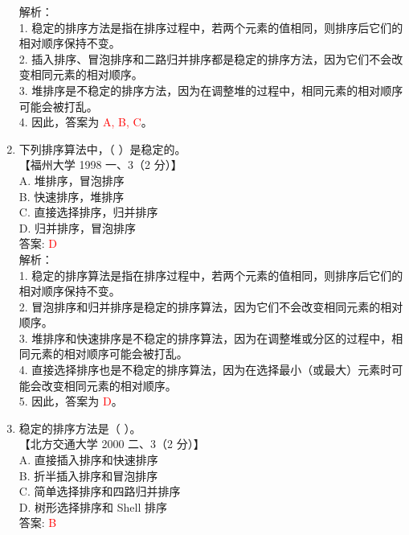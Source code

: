 \documentclass[lang=cn,newtx,10pt,scheme=chinese]{../../../elegantbook}
\begin{document}
\begin{enumerate}
    解析：\\
    1. 稳定的排序方法是指在排序过程中，若两个元素的值相同，则排序后它们的相对顺序保持不变。\\
    2. 插入排序、冒泡排序和二路归并排序都是稳定的排序方法，因为它们不会改变相同元素的相对顺序。\\
    3. 堆排序是不稳定的排序方法，因为在调整堆的过程中，相同元素的相对顺序可能会被打乱。\\
    4. 因此，答案为 \textcolor{red}{A, B, C}。\\

    \item 下列排序算法中，（ ）是稳定的。\\
    【福州大学 1998 一、3（2 分）】\\

    A. 堆排序，冒泡排序 \\  
    B. 快速排序，堆排序 \\  
    C. 直接选择排序，归并排序 \\  
    D. 归并排序，冒泡排序 \\

    答案: \textcolor{red}{D} \\

    解析：\\
    1. 稳定的排序算法是指在排序过程中，若两个元素的值相同，则排序后它们的相对顺序保持不变。\\
    2. 冒泡排序和归并排序是稳定的排序算法，因为它们不会改变相同元素的相对顺序。\\
    3. 堆排序和快速排序是不稳定的排序算法，因为在调整堆或分区的过程中，相同元素的相对顺序可能会被打乱。\\
    4. 直接选择排序也是不稳定的排序算法，因为在选择最小（或最大）元素时可能会改变相同元素的相对顺序。\\
    5. 因此，答案为 \textcolor{red}{D}。\\

    \item 稳定的排序方法是（ ）。\\
    【北方交通大学 2000 二、3（2 分）】\\

    A. 直接插入排序和快速排序 \\  
    B. 折半插入排序和冒泡排序 \\  
    C. 简单选择排序和四路归并排序 \\  
    D. 树形选择排序和 Shell 排序 \\

    答案: \textcolor{red}{B} \\


\end{enumerate}
\end{document}

